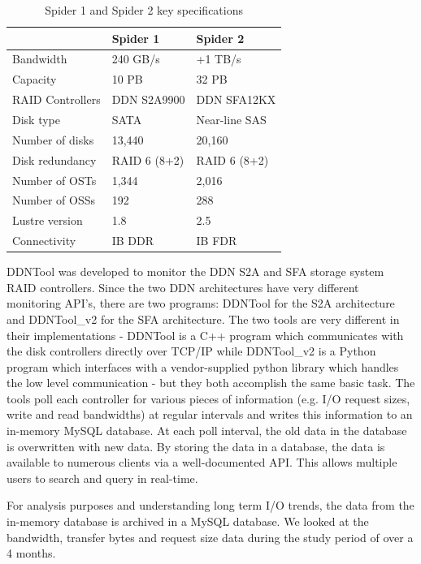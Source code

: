 \begin{table}
\begin{center}
\begin{tabular}{l||l|l}
 & Spider 1 & Spider 2\\
\hline
Bandwidth & 240 GB/s & +1 TB/s \\
Capacity & 10 PB & 32 PB \\
RAID Controllers & DDN S2A9900 & DDN SFA12KX\\
Disk type & SATA & Near-line SAS\\
Number of disks & 13,440 & 20,160\\
Disk redundancy & RAID 6 (8+2) & RAID 6 (8+2)\\
Number of OSTs & 1,344 & 2,016\\
Number of OSSs & 192 & 288\\
Lustre version & 1.8 & 2.5\\
Connectivity & IB DDR & IB FDR\\ 
\end{tabular}
\end{center}
\caption{Spider 1 and Spider 2 key specifications}
\label{table:spider12}
\end{table}


DDNTool \cite{ddntool10:ross} was developed to monitor the DDN S2A and SFA
storage system RAID controllers. Since the two DDN architectures have very
different monitoring API's, there are two programs:  DDNTool for the S2A 
architecture and DDNTool\_v2 for the SFA architecture. The two tools are very different in their implementations -
DDNTool is a C++ program which communicates with the disk controllers directly
over TCP/IP while DDNTool\_v2 is a Python program which interfaces with a
vendor-supplied python library which handles the low level communication - but
they both accomplish the same basic task. The tools poll each controller for
various pieces of information (e.g. I/O request sizes, write and read
bandwidths) at regular intervals and writes this information to an in-memory MySQL database.
At each poll interval, the old data in the database is overwritten with new data. By storing the data in
a database, the data is available to numerous clients via a
well-documented API. This allows multiple users to search and query in
real-time. 

For analysis purposes and understanding long term I/O trends, the data from the in-memory database is
archived in a MySQL database. We looked at the bandwidth, transfer bytes and request size data during 
the study period of over a 4 months.    

